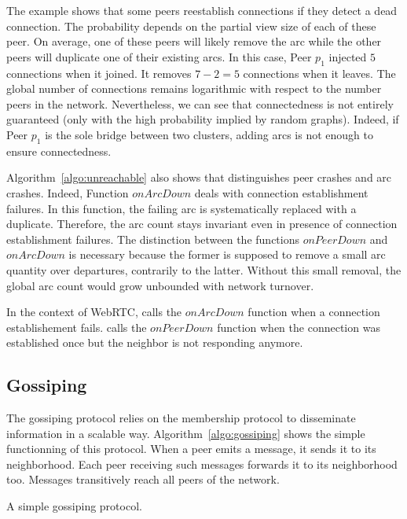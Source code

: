 The example shows that some peers reestablish connections if they
detect a dead connection. The probability depends on the partial view
size of each of these peer. On average, one of these peers will likely
remove the arc while the other peers will duplicate one of their
existing arcs. In this case, Peer $p_1$ injected $5$ connections when
it joined. It removes $7-2 =5 $ connections when it leaves. The global
number of connections remains logarithmic with respect to the number
peers in the network. Nevertheless, we can see that connectedness is
not entirely guaranteed (only with the high probability implied by
random graphs). Indeed, if Peer $p_1$ is the sole bridge between two
clusters, adding arcs is not enough to ensure connectedness.

Algorithm~\ref{algo:unreachable} also shows that \SPRAY distinguishes peer
crashes and arc crashes. Indeed, Function $onArcDown$ deals with connection
establishment failures. In this function, the failing arc is systematically
replaced with a duplicate. Therefore, the arc count stays invariant even in
presence of connection establishment failures. The distinction between the
functions $onPeerDown$ and $onArcDown$ is necessary because the former is
supposed to remove a small arc quantity over departures, contrarily to the
latter. Without this small removal, the global arc count would grow unbounded
with network turnover.

In the context of WebRTC, \SPRAY calls the $onArcDown$ function when a connection
establishement fails. \SPRAY calls the $onPeerDown$ function when the
connection was established once but the neighbor is not responding anymore.

\subsection{Gossiping}
\label{subsec:gossiping}

The gossiping protocol relies on the membership protocol to disseminate
information in a scalable way. Algorithm~\ref{algo:gossiping} shows the simple
functionning of this protocol. When a peer emits a message, it sends it to its
neighborhood. Each peer receiving such messages forwards it to its neighborhood
too. Messages transitively reach all peers of the network.

\begin{algorithm}[h]
  
  \caption{\label{algo:gossiping}A simple gossiping protocol.}
\end{algorithm}

